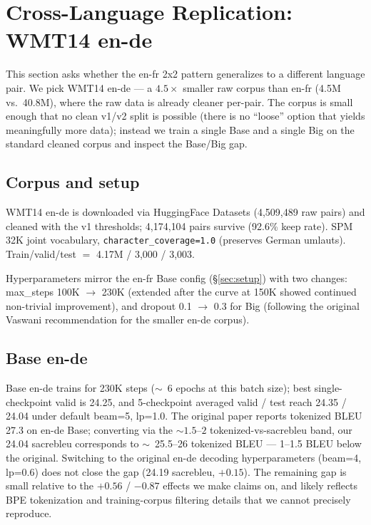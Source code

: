 \section{Cross-Language Replication: WMT14 en-de}
\label{sec:ende}

This section asks whether the en-fr 2x2 pattern generalizes to a different language pair. We pick WMT14 en-de --- a $4.5\times$ smaller raw corpus than en-fr (4.5M vs.\ 40.8M), where the raw data is already cleaner per-pair. The corpus is small enough that no clean v1/v2 split is possible (there is no ``loose'' option that yields meaningfully more data); instead we train a single Base and a single Big on the standard cleaned corpus and inspect the Base/Big gap.

\subsection{Corpus and setup}
WMT14 en-de is downloaded via HuggingFace Datasets (4{,}509{,}489 raw pairs) and cleaned with the v1 thresholds; 4{,}174{,}104 pairs survive (92.6\% keep rate). SPM 32K joint vocabulary, \texttt{character\_coverage=1.0} (preserves German umlauts). Train/valid/test $=$ 4.17M / 3{,}000 / 3{,}003.

Hyperparameters mirror the en-fr Base config (\S\ref{sec:setup}) with two changes: max\_steps 100K $\rightarrow$ 230K (extended after the curve at 150K showed continued non-trivial improvement), and dropout 0.1 $\rightarrow$ 0.3 for Big (following the original Vaswani recommendation for the smaller en-de corpus).

\subsection{Base en-de}
Base en-de trains for 230K steps ($\sim$~6 epochs at this batch size); best single-checkpoint valid is 24.25, and 5-checkpoint averaged valid / test reach 24.35 / 24.04 under default beam=5, lp=1.0. The original paper reports tokenized BLEU 27.3 on en-de Base; converting via the ${\sim}1.5$--$2$ tokenized-vs-sacrebleu band, our 24.04 sacrebleu corresponds to $\sim$~25.5--26 tokenized BLEU --- 1--1.5 BLEU below the original. Switching to the original en-de decoding hyperparameters (beam=4, lp=0.6) does not close the gap (24.19 sacrebleu, $+0.15$). The remaining gap is small relative to the $+0.56$ / $-0.87$ effects we make claims on, and likely reflects BPE tokenization and training-corpus filtering details that we cannot precisely reproduce.


